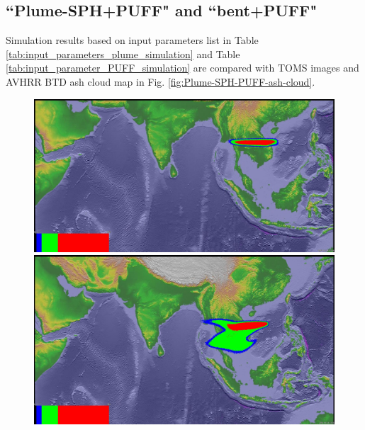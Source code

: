 \subsection{``Plume-SPH+PUFF" and ``bent+PUFF"}

Simulation results based on input parameters list in Table \ref{tab:input_parameters_plume_simulation} and Table \ref{tab:input_parameter_PUFF_simulation} are compared with TOMS images and AVHRR BTD ash cloud map in Fig. \ref{fig:Plume-SPH-PUFF-ash-cloud}.

\begin{figure}[!htb]
    \centering
    \begin{minipage}{.325\textwidth}
        \centering
        \includegraphics[width=0.99 \textwidth]{Chapter-7/Figures/bent-23hr-ash}
    \end{minipage}%
    \begin{minipage}{.325 \textwidth}
        \centering
        \includegraphics[width=0.99 \textwidth]{Chapter-7/Figures/SPH-Plume-23hr-ash}
    \end{minipage}%
    \begin{minipage}{.325 \textwidth}
        \centering

\end{minipage}
\end{figure}
